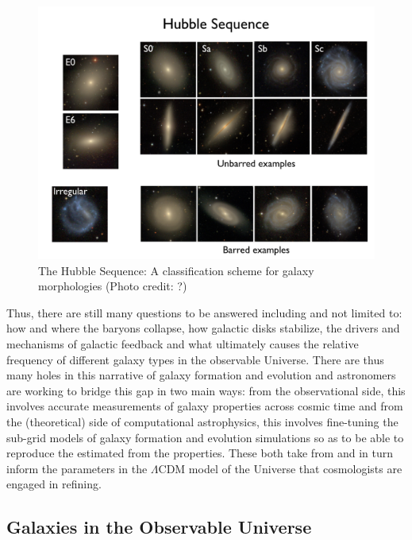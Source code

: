 \begin{figure}
\includegraphics[width=\textwidth]{figures/hubble.jpeg}
\caption[ The Hubble Sequence: A classification scheme for galaxy morphologies (Photo credit: ?)]
{The Hubble Sequence: A classification scheme for galaxy morphologies (Photo credit: ?)
\label{fig:hubble_classification}}
\end{figure}

Thus, there are still many questions to be answered including and not limited to: how and where the baryons collapse, how galactic disks stabilize, the drivers and mechanisms of galactic feedback and what ultimately causes the relative frequency of different galaxy types in the observable Universe. There are thus many holes in this narrative of galaxy formation and evolution and astronomers are working to bridge this gap in two main ways: from the observational side, this involves accurate measurements of galaxy properties across cosmic time and from the (theoretical) side of computational astrophysics, this involves fine-tuning the sub-grid models of galaxy formation and evolution simulations so as to be able to reproduce the estimated from the properties. These both take from and in turn inform the parameters in the $\Lambda$CDM model of the Universe that cosmologists are engaged in refining.\\

\subsection{Galaxies in the Observable Universe}

